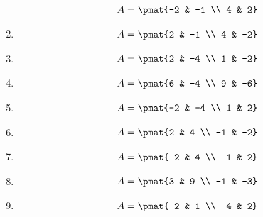 \begin{enumerate}
\begin{align*}
A = \pmat{-2 & -1 \\ 4 & 2}
\end{align*}

\item

\begin{align*}
A = \pmat{2 & -1 \\ 4 & -2}
\end{align*}

\item

\begin{align*}
A = \pmat{2 & -4 \\ 1 & -2}
\end{align*}

\item

\begin{align*}
A = \pmat{6 & -4 \\ 9 & -6}
\end{align*}

\item

\begin{align*}
A = \pmat{-2 & -4 \\ 1 & 2}
\end{align*}

\item

\begin{align*}
A = \pmat{2 & 4 \\ -1 & -2}
\end{align*}

\item

\begin{align*}
A = \pmat{-2 & 4 \\ -1 & 2}
\end{align*}

\item

\begin{align*}
A = \pmat{3 & 9 \\ -1 & -3}
\end{align*}

\item

\begin{align*}
A = \pmat{-2 & 1 \\ -4 & 2}
\end{align*}


\end{enumerate}
